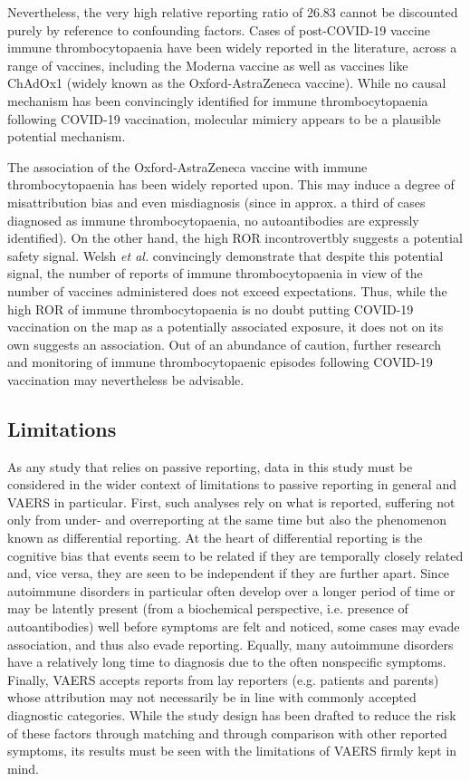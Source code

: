 \documentclass{article}
\begin{document}
Nevertheless, the very high relative reporting ratio of 26.83 cannot be discounted purely by reference to confounding factors.
Cases of post-COVID-19 vaccine immune thrombocytopaenia have been widely reported in the literature,\cite{xie2021covid,tarawneh2021immune,tiede2021prothrombotic,pai2021vaccine} across a range of vaccines, including the Moderna vaccine as well as vaccines like ChAdOx1 (widely known as the Oxford-AstraZeneca vaccine).
While no causal mechanism has been convincingly identified for immune thrombocytopaenia following COVID-19 vaccination, molecular mimicry appears to be a plausible potential mechanism.\cite{saudagar2021vigilance}

The association of the Oxford-AstraZeneca vaccine with immune thrombocytopaenia has been widely reported upon.\cite{pishko2021covid}
This may induce a degree of misattribution bias and even misdiagnosis (since in approx. a third of cases diagnosed as immune thrombocytopaenia, no autoantibodies are expressly identified).
On the other hand, the high ROR incontrovertbly suggests a potential safety signal.
Welsh \textit{et al.} convincingly demonstrate that despite this potential signal, the number of reports of immune thrombocytopaenia in view of the number of vaccines administered does not exceed expectations.\cite{WELSH20213329}
Thus, while the high ROR of immune thrombocytopaenia is no doubt putting COVID-19 vaccination on the map as a potentially associated exposure, it does not on its own suggests an association.
Out of an abundance of caution, further research and monitoring of immune thrombocytopaenic episodes following COVID-19 vaccination may nevertheless be advisable.

\subsection{Limitations}

As any study that relies on passive reporting, data in this study must be considered in the wider context of limitations to passive reporting in general and VAERS in particular.
First, such analyses rely on what is reported, suffering not only from under- and overreporting at the same time but also the phenomenon known as differential reporting.\cite{rosenthal1995reporting}
At the heart of differential reporting is the cognitive bias that events seem to be related if they are temporally closely related and, vice versa, they are seen to be independent if they are further apart.
Since autoimmune disorders in particular often develop over a longer period of time or may be latently present (from a biochemical perspective, i.e. presence of autoantibodies) well before symptoms are felt and noticed, some cases may evade association, and thus also evade reporting.
Equally, many autoimmune disorders have a relatively long time to diagnosis due to the often nonspecific symptoms.
Finally, VAERS accepts reports from lay reporters (e.g. patients and parents) whose attribution may not necessarily be in line with commonly accepted diagnostic categories.
While the study design has been drafted to reduce the risk of these factors through matching and through comparison with other reported symptoms, its results must be seen with the limitations of VAERS firmly kept in mind.
\end{document}
